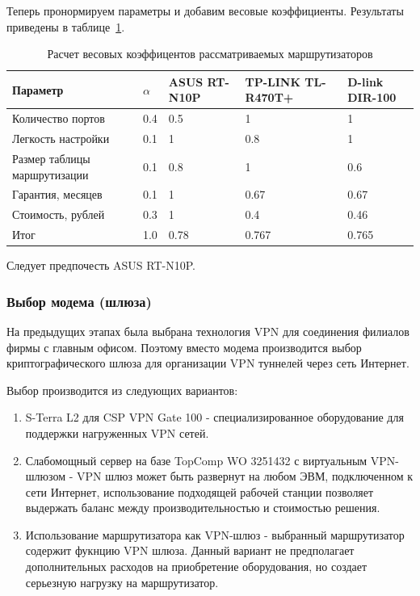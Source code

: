 \documentclass[russian,utf8,emptystyle]{eskdtext}
\begin{document}
Теперь пронормируем параметры и добавим весовые коэффициенты. Результаты приведены в таблице~\ref{tab:routers-2}.

\begin{longtable}{p{7cm}|p{1cm}|p{2cm}|p{2cm}|p{2cm}}
\caption{Расчет весовых коэффицентов рассматриваемых маршрутизаторов}
\label{tab:routers-2} \\
Параметр                     & $\alpha$ & ASUS RT-N10P & TP-LINK TL-R470T+ & D-link DIR-100 \\ 
\hline 
Количество портов            & 0.4      & 0.5       & 1      & 1  \\ 
Легкость настройки           & 0.1      & 1         & 0.8    & 1  \\ 
Размер таблицы маршрутизации & 0.1      & 0.8       & 1      & 0.6  \\ 
Гарантия, месяцев            & 0.1      & 1         & 0.67   & 0.67  \\ 
Стоимость, рублей            & 0.3      & 1         & 0.4    & 0.46 \\
\hline
Итог                         & 1.0      & 0.78      & 0.767  & 0.765    
\end{longtable}

Следует предпочесть ASUS RT-N10P.

\clearpage
\subsubsection{Выбор модема (шлюза)}
На предыдущих этапах была выбрана технология VPN для соединения филиалов фирмы с главным офисом. Поэтому вместо модема производится выбор криптографического шлюза для организации VPN туннелей через сеть Интернет.

Выбор производится из следующих вариантов:
\begin{enumerate}[label=\arabic*.]
\item S-Terra L2 для CSP VPN Gate 100 - специализированное оборудование для поддержки нагруженных VPN сетей.
\item Слабомощный сервер на базе TopComp WO 3251432 с виртуальным VPN-шлюзом - VPN шлюз может быть развернут на любом ЭВМ, подключенном к сети Интернет, использование подходящей рабочей станции позволяет выдержать баланс между производительностью и стоимостью решения.
\item Использование маршрутизатора как VPN-шлюз - выбранный маршрутизатор содержит фукнцию VPN шлюза. Данный вариант не предполагает дополнительных расходов на приобретение оборудования, но создает серьезную нагрузку на маршрутизатор.
\end{enumerate}
\end{document}
